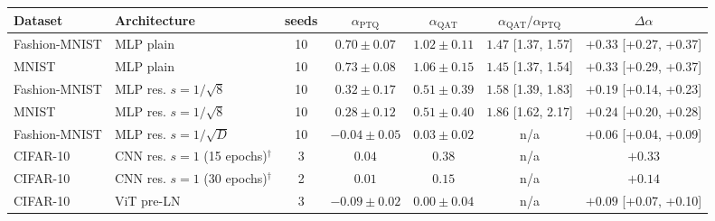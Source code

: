 \begin{tabular}{llccccc}
\toprule
Dataset & Architecture & seeds & $\alpha_{\mathrm{PTQ}}$ & $\alpha_{\mathrm{QAT}}$ & $\alpha_{\mathrm{QAT}}/\alpha_{\mathrm{PTQ}}$ & $\Delta\alpha$ \\
\midrule
Fashion-MNIST & MLP plain & 10 & $0.70\pm0.07$ & $1.02\pm0.11$ & $1.47$ {\scriptsize[1.37, 1.57]} & $+0.33$ {\scriptsize[+0.27, +0.37]} \\
MNIST & MLP plain & 10 & $0.73\pm0.08$ & $1.06\pm0.15$ & $1.45$ {\scriptsize[1.37, 1.54]} & $+0.33$ {\scriptsize[+0.29, +0.37]} \\
Fashion-MNIST & MLP res. $s=1/\sqrt{8}$ & 10 & $0.32\pm0.17$ & $0.51\pm0.39$ & $1.58$ {\scriptsize[1.39, 1.83]} & $+0.19$ {\scriptsize[+0.14, +0.23]} \\
MNIST & MLP res. $s=1/\sqrt{8}$ & 10 & $0.28\pm0.12$ & $0.51\pm0.40$ & $1.86$ {\scriptsize[1.62, 2.17]} & $+0.24$ {\scriptsize[+0.20, +0.28]} \\
Fashion-MNIST & MLP res. $s=1/\sqrt{D}$ & 10 & $-0.04\pm0.05$ & $0.03\pm0.02$ & n/a & $+0.06$ {\scriptsize[+0.04, +0.09]} \\
CIFAR-10 & CNN res. $s=1$ (15 epochs)$^\dagger$ & 3 & $0.04$ & $0.38$ & n/a & $+0.33$ \\
CIFAR-10 & CNN res. $s=1$ (30 epochs)$^\dagger$ & 2 & $0.01$ & $0.15$ & n/a & $+0.14$ \\
CIFAR-10 & ViT pre-LN & 3 & $-0.09\pm0.02$ & $0.00\pm0.04$ & n/a & $+0.09$ {\scriptsize[+0.07, +0.10]} \\
\bottomrule
\end{tabular}

